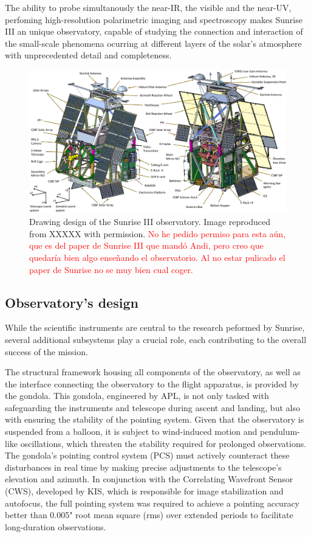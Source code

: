 The ability to probe simultanously the near-IR, the visible and the near-UV, perfoming high-resolution polarimetric imaging and spectroscopy makes Sunrise III an unique observatory, capable of studying the connection  and interaction of the small-scale phenomena ocurring at different layers of the solar's atmosphere with unprecedented detail and completeness. 

\begin{figure}[t]
    \includegraphics[width=\textwidth]{figures/TuMag/Sunrise_schematic.png}
    \caption[Sunrise III observatory design.]{
      Drawing design of the Sunrise III observatory. Image reproduced from XXXXX with permission. \textcolor{red}{No he pedido permiso para esta aún, que es del paper de Sunrise III que mandó Andi, pero creo que quedaría bien algo enseñando el observatorio. Al no estar pulicado el paper de Sunrise no se muy bien cual coger.}}
      \label{fig: SunriseIII}
\end{figure}

\subsection{Observatory's design}

While the scientific instruments are central to the research peformed by Sunrise, several additional subsystems play a crucial role, each contributing to the overall success of the mission.

The structural framework housing all components of the observatory, as well as the interface connecting the observatory to the flight apparatus, is provided by the gondola. This gondola, engineered by APL, is not only tasked with safeguarding the instruments and telescope during ascent and landing, but also with ensuring the stability of the pointing system. Given that the observatory is suspended from a balloon, it is subject to wind-induced motion and pendulum-like oscillations, which threaten the stability required for prolonged observations. The gondola’s pointing control system (PCS) must actively counteract these disturbances in real time by making precise adjustments to the telescope’s elevation and azimuth. In conjunction with the Correlating Wavefront Sensor (CWS), developed by KIS, which is responsible for image stabilization and autofocus, the full pointing system was required to achieve a pointing accuracy better than 0.005" root mean square (rms) over extended periods to facilitate long-duration observations.

